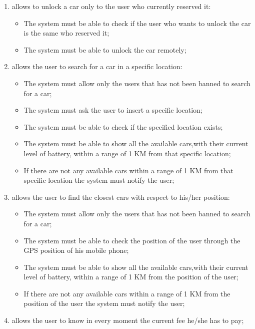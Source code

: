 \begin{enumerate}
\item  allows to unlock a car only to the user who currently reserved it:

\begin{itemize}
	\item The system must be able to check if the user who wants to unlock the car is the same who reserved it;
	\item The system must be able to unlock the car remotely;
\end{itemize}

\item allows the user to search for a car in a specific location:

\begin{itemize}
	\item The system must allow only the users that has not been banned to search for a car;
	\item The system must ask the user to insert a specific location;
	\item The system must be able to check if the specified location exists;
	\item The system must be able to show all the available cars,with their current level of battery, within a range of 1 KM from that specific location;
	\item If there are not any available cars within a range of 1 KM from that specific location the system must notify the user;
\end{itemize}

\item allows the user to find the closest cars with respect to his/her position:

\begin{itemize}
	\item The system must allow only the users that has not been banned to search for a car;
	\item The system must be able to check the position of the user through the GPS position of his mobile phone;
	\item The system must be able to show all the available cars,with their current level of battery, within a range of 1 KM from the position of the user;
	\item If there are not any available cars within a range of 1 KM from the position of the user the system must notify the user;
\end{itemize}

\item allows the user to know in every moment the current fee he/she has to pay;


\end{enumerate}
